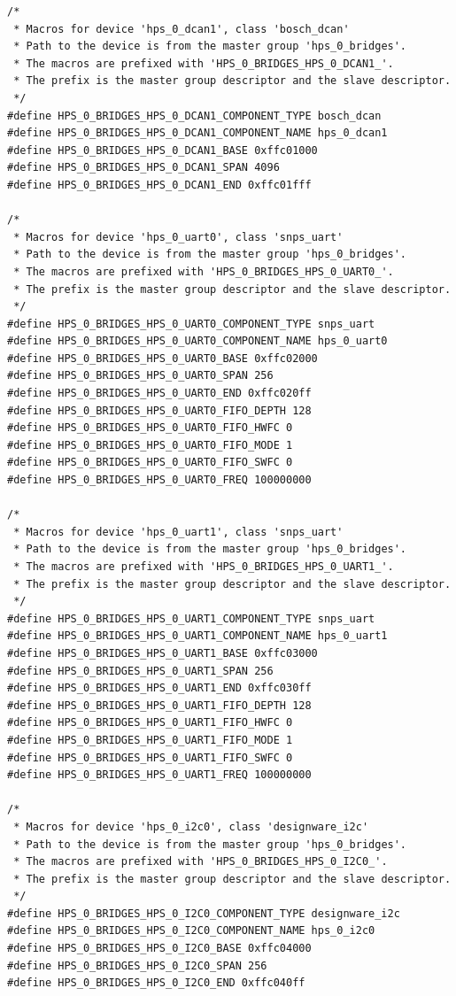 \documentclass[conference]{IEEEtran}
\begin{document}
\begin{lstlisting}
/*
 * Macros for device 'hps_0_dcan1', class 'bosch_dcan'
 * Path to the device is from the master group 'hps_0_bridges'.
 * The macros are prefixed with 'HPS_0_BRIDGES_HPS_0_DCAN1_'.
 * The prefix is the master group descriptor and the slave descriptor.
 */
#define HPS_0_BRIDGES_HPS_0_DCAN1_COMPONENT_TYPE bosch_dcan
#define HPS_0_BRIDGES_HPS_0_DCAN1_COMPONENT_NAME hps_0_dcan1
#define HPS_0_BRIDGES_HPS_0_DCAN1_BASE 0xffc01000
#define HPS_0_BRIDGES_HPS_0_DCAN1_SPAN 4096
#define HPS_0_BRIDGES_HPS_0_DCAN1_END 0xffc01fff

/*
 * Macros for device 'hps_0_uart0', class 'snps_uart'
 * Path to the device is from the master group 'hps_0_bridges'.
 * The macros are prefixed with 'HPS_0_BRIDGES_HPS_0_UART0_'.
 * The prefix is the master group descriptor and the slave descriptor.
 */
#define HPS_0_BRIDGES_HPS_0_UART0_COMPONENT_TYPE snps_uart
#define HPS_0_BRIDGES_HPS_0_UART0_COMPONENT_NAME hps_0_uart0
#define HPS_0_BRIDGES_HPS_0_UART0_BASE 0xffc02000
#define HPS_0_BRIDGES_HPS_0_UART0_SPAN 256
#define HPS_0_BRIDGES_HPS_0_UART0_END 0xffc020ff
#define HPS_0_BRIDGES_HPS_0_UART0_FIFO_DEPTH 128
#define HPS_0_BRIDGES_HPS_0_UART0_FIFO_HWFC 0
#define HPS_0_BRIDGES_HPS_0_UART0_FIFO_MODE 1
#define HPS_0_BRIDGES_HPS_0_UART0_FIFO_SWFC 0
#define HPS_0_BRIDGES_HPS_0_UART0_FREQ 100000000

/*
 * Macros for device 'hps_0_uart1', class 'snps_uart'
 * Path to the device is from the master group 'hps_0_bridges'.
 * The macros are prefixed with 'HPS_0_BRIDGES_HPS_0_UART1_'.
 * The prefix is the master group descriptor and the slave descriptor.
 */
#define HPS_0_BRIDGES_HPS_0_UART1_COMPONENT_TYPE snps_uart
#define HPS_0_BRIDGES_HPS_0_UART1_COMPONENT_NAME hps_0_uart1
#define HPS_0_BRIDGES_HPS_0_UART1_BASE 0xffc03000
#define HPS_0_BRIDGES_HPS_0_UART1_SPAN 256
#define HPS_0_BRIDGES_HPS_0_UART1_END 0xffc030ff
#define HPS_0_BRIDGES_HPS_0_UART1_FIFO_DEPTH 128
#define HPS_0_BRIDGES_HPS_0_UART1_FIFO_HWFC 0
#define HPS_0_BRIDGES_HPS_0_UART1_FIFO_MODE 1
#define HPS_0_BRIDGES_HPS_0_UART1_FIFO_SWFC 0
#define HPS_0_BRIDGES_HPS_0_UART1_FREQ 100000000

/*
 * Macros for device 'hps_0_i2c0', class 'designware_i2c'
 * Path to the device is from the master group 'hps_0_bridges'.
 * The macros are prefixed with 'HPS_0_BRIDGES_HPS_0_I2C0_'.
 * The prefix is the master group descriptor and the slave descriptor.
 */
#define HPS_0_BRIDGES_HPS_0_I2C0_COMPONENT_TYPE designware_i2c
#define HPS_0_BRIDGES_HPS_0_I2C0_COMPONENT_NAME hps_0_i2c0
#define HPS_0_BRIDGES_HPS_0_I2C0_BASE 0xffc04000
#define HPS_0_BRIDGES_HPS_0_I2C0_SPAN 256
#define HPS_0_BRIDGES_HPS_0_I2C0_END 0xffc040ff


\end{lstlisting}
\end{document}
